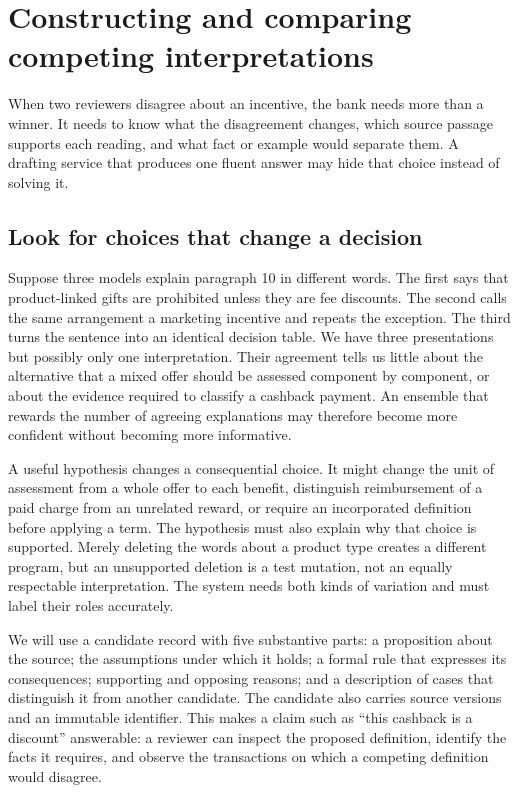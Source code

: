 \chapter{Constructing and comparing competing interpretations}
\label{ch:search}

When two reviewers disagree about an incentive, the bank needs more than a
winner. It needs to know what the disagreement changes, which source passage
supports each reading, and what fact or example would separate them. A drafting
service that produces one fluent answer may hide that choice instead of solving
it.

\section{Look for choices that change a decision}
\label{merge:M05:00}


Suppose three models explain paragraph 10 in different words. The first says that
product-linked gifts are prohibited unless they are fee discounts. The second
calls the same arrangement a marketing incentive and repeats the exception. The
third turns the sentence into an identical decision table. We have three
presentations but possibly only one interpretation. Their agreement tells us
little about the alternative that a mixed offer should be assessed component by
component, or about the evidence required to classify a cashback payment. An
ensemble that rewards the number of agreeing explanations may therefore become
more confident without becoming more informative.

A useful hypothesis changes a consequential choice. It might change the unit of
assessment from a whole offer to each benefit, distinguish reimbursement of a
paid charge from an unrelated reward, or require an incorporated definition
before applying a term. The hypothesis must also explain why that choice is
supported. Merely deleting the words about a product type creates a different
program, but an unsupported deletion is a test mutation, not an equally
respectable interpretation. The system needs both kinds of variation and must
label their roles accurately.


We will use a candidate record with five substantive parts: a proposition about
the source; the assumptions under which it holds; a formal rule that expresses
its consequences; supporting and opposing reasons; and a description of cases
that distinguish it from another candidate. The candidate also carries source
versions and an immutable identifier. This makes a claim such as ``this cashback
is a discount'' answerable: a reviewer can inspect the proposed definition,
identify the facts it requires, and observe the transactions on which a competing
definition would disagree.

